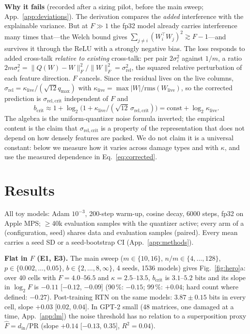 \documentclass{article}
\begin{document}
\textbf{Why it fails} (recorded after a sizing pilot, before the main sweep; App.~\ref{app:deviations}). The derivation
compares the \emph{added} interference with the explainable variance. But at $F\gg1$ the fp32 model already carries
interference many times that---the Welch bound gives $\sum_{j\neq i}(W_i^\top W_j)^2 \gtrsim F-1$---and survives it
through the ReLU with a strongly negative bias. The loss responds to added cross-talk \emph{relative to existing}
cross-talk: per pair $2\sigma_\varepsilon^2$ against $1/m$, a ratio $2m\sigma_\varepsilon^2 =
\lVert Q(W)-W\rVert_F^2/\lVert W\rVert_F^2 = \sigma_{\mathrm{rel}}^2$, the squared relative perturbation of each feature
direction. $F$ cancels. Since the residual lives on the live columns, $\sigma_{\mathrm{rel}} =
\kappa_{\mathrm{live}}/(\sqrt{12}q_{\max})$ with $\kappa_{\mathrm{live}} = \max|W|/\mathrm{rms}(W_{\mathrm{live}})$, so the
corrected prediction is $\sigma_{\mathrm{rel,crit}}$ independent of $F$ and
\begin{equation}
b_{\mathrm{crit}} \approx 1+\log_2\!\big(1+\kappa_{\mathrm{live}}/(\sqrt{12}\,\sigma_{\mathrm{rel,crit}})\big) = \mathrm{const} + \log_2\kappa_{\mathrm{live}} .
\label{eq:corrected}
\end{equation}
The algebra is the uniform-quantizer noise formula inverted; the empirical content is the claim that
$\sigma_{\mathrm{rel,crit}}$ is a property of the representation that does not depend on how densely features are packed.
We do not claim it is a universal constant: below we measure how it varies across damage types and with $\kappa$, and use
the measured dependence in Eq.~\eqref{eq:corrected}.

\section{Results}
All toy models: Adam $10^{-3}$, 200-step warm-up, cosine decay, 6000 steps, fp32 on Apple MPS; $\ge$40k evaluation
samples with the quantizer active; every arm of a (configuration, seed) shares data and evaluation samples (paired).
Every mean carries a seed SD or a seed-bootstrap CI (App.~\ref{app:methods}).

\textbf{Flat in $F$ (E1, E3).} The main sweep ($m\in\{10,16\}$, $n/m\in\{4,\dots,128\}$, $p\in\{0.002,\dots,0.05\}$,
$b\in\{2,\dots,8,\infty\}$, 4 seeds, 1536 models) gives Fig.~\ref{fig:hero}a: over 40 cells with $F = 4.0$--$56.5$
and $\kappa = 2.5$--$13.5$, $b_{\mathrm{crit}}$ is $3.1$--$5.2$ bits and its slope in $\log_2F$ is $-0.11$
[$-0.12$, $-0.09$] (90\,\%: $-0.15$; 99\,\%: $+0.04$; hard count where defined: $-0.27$). Post-training RTN on the same
models: $3.87\pm0.15$ bits in every cell, slope $+0.03$ [$0.02$, $0.04$]. In GPT-2 small (48 matrices, one damaged
at a time, App.~\ref{app:lm}) the noise threshold has no relation to a superposition proxy $\hat F = d_{\mathrm{in}}/\mathrm{PR}$
(slope $+0.14$ [$-0.13$, $0.35$], $R^2=0.04$).
\end{document}
